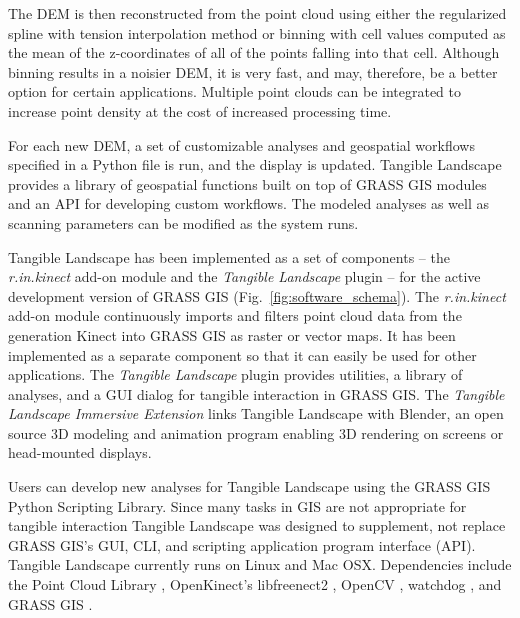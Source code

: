 \documentclass[prodmode,acmtochi]{acmsmall} %
\begin{document}
The DEM is then reconstructed from the point cloud
using either the regularized spline with tension 
interpolation method \cite{Mitasova2005}
or binning with cell values computed 
as the mean of the z-coordinates of all of the points 
falling into that cell.
Although binning results in a noisier DEM, it is very fast,
and may, therefore, be a better option for certain applications. 
Multiple point clouds can be integrated 
to increase point density at the cost of increased
processing time.

For each new DEM, 
a set of customizable analyses and geospatial workflows
specified in a Python file is run, and the display is updated.
Tangible Landscape provides a library of geospatial functions 
built on top of GRASS GIS modules 
and an API for developing custom workflows.
The modeled analyses as well as scanning parameters can be modified 
as the system runs.

Tangible Landscape has been implemented as a set of components 
-- the \emph{r.in.kinect} add-on module \cite{r.in.kinect}
and the \emph{Tangible Landscape} plugin \cite{grass-tangible-landscape}
--
for the active development version of GRASS GIS (Fig.~\ref{fig:software_schema}). 
The \emph{r.in.kinect} add-on module continuously imports and filters point cloud data from the  generation Kinect into GRASS GIS as raster or vector maps. 
It has been implemented as a separate component so that it can easily be used for other applications.
The \emph{Tangible Landscape} plugin provides 
utilities, a library of analyses, and a GUI dialog for tangible interaction in GRASS GIS.
The \emph{Tangible Landscape Immersive Extension} \cite{tangible-landscape-immersive-extension}
links Tangible Landscape with Blender, 
an open source 3D modeling and animation program \cite{Blender} 
enabling 3D rendering on screens or head-mounted displays.

Users can develop new analyses for Tangible Landscape 
using the GRASS GIS Python Scripting Library.  %
Since many tasks in GIS are not appropriate for tangible interaction
Tangible Landscape was designed to supplement, 
not replace GRASS GIS's GUI, CLI, and scripting application program interface (API). 
Tangible Landscape currently runs on Linux and Mac OSX.
Dependencies include the Point Cloud Library \cite{Rusu2011,PCL}, 
OpenKinect's libfreenect2 \cite{OpenKinect}, 
OpenCV \cite{OpenCV},  
watchdog \cite{watchdog}, 
and GRASS GIS \cite{GRASS_GIS_software}.
\end{document}
